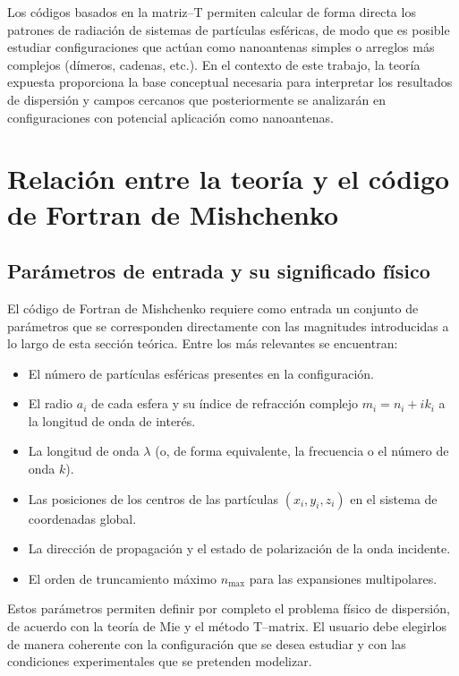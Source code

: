 \documentclass[12pt,a4paper]{article}
\begin{document}
Los códigos basados en la matriz--T permiten calcular de forma directa los patrones de radiación de sistemas de partículas esféricas, de modo que es posible estudiar configuraciones
que actúan como nanoantenas simples o arreglos más complejos (dímeros, cadenas, etc.).
En el contexto de este trabajo, la teoría expuesta proporciona la base conceptual necesaria para interpretar los resultados de dispersión y campos cercanos
que posteriormente se analizarán en configuraciones con potencial aplicación como nanoantenas.


\section{Relación entre la teoría y el código de Fortran de Mishchenko}

\subsection{Parámetros de entrada y su significado físico}

El código de Fortran de Mishchenko requiere como entrada un conjunto de parámetros que se corresponden directamente con las magnitudes introducidas a lo largo de esta sección teórica.
Entre los más relevantes se encuentran:

\begin{itemize}
  \item El número de partículas esféricas presentes en la configuración.
  \item El radio $a_i$ de cada esfera y su índice de refracción complejo $m_i = n_i + i k_i$ a la longitud de onda de interés.
  \item La longitud de onda $\lambda$ (o, de forma equivalente, la frecuencia o el número de onda $k$).
  \item Las posiciones de los centros de las partículas $(x_i, y_i, z_i)$ en el sistema de coordenadas global.
  \item La dirección de propagación y el estado de polarización de la onda incidente.
  \item El orden de truncamiento máximo $n_{\text{max}}$ para las expansiones multipolares.
\end{itemize}

Estos parámetros permiten definir por completo el problema físico de dispersión, de acuerdo con la teoría de Mie y el método T--matrix.
El usuario debe elegirlos de manera coherente con la configuración que se desea estudiar y con las condiciones experimentales que se pretenden modelizar.
\end{document}
